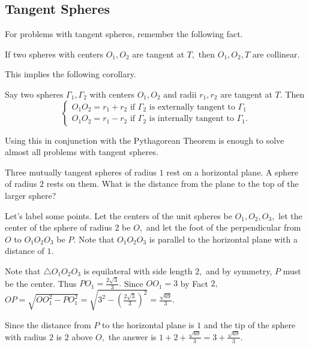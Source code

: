 \subsection{Tangent Spheres}
For problems with tangent spheres, remember the following fact.
\begin{fact}
If two spheres with centers $O_1,O_2$ are tangent at $T,$ then $O_1,O_2,T$ are collinear.
\end{fact}
This implies the following corollary.
\begin{fact}
Say two spheres $\Gamma_1,\Gamma_2$ with centers $O_1,O_2$ and radii $r_1,r_2$ are tangent at $T.$ Then
\[\begin{cases}
O_1O_2=r_1+r_2 \text{ if } \Gamma_2 \text{ is externally tangent to } \Gamma_1 \\
O_1O_2=r_1-r_2 \text{ if } \Gamma_2 \text{ is internally tangent to } \Gamma_1.
\end{cases}\]
\end{fact}
Using this in conjunction with the Pythagorean Theorem is enough to solve almost all problems with tangent spheres.
\begin{exam}[AMC 12A 2004/22]
Three mutually tangent spheres of radius $1$ rest on a horizontal plane. A sphere of radius $2$ rests on them. What is the distance from the plane to the top of the larger sphere?
\end{exam}
\begin{sol}
Let's label some points. Let the centers of the unit spheres be $O_1,O_2,O_3,$ let the center of the sphere of radius $2$ be $O,$ and let the foot of the perpendicular from $O$ to $O_1O_2O_3$ be $P.$ Note that $O_1O_2O_3$ is parallel to the horizontal plane with a distance of $1.$

Note that $\triangle O_1O_2O_3$ is equilateral with side length $2,$ and by symmetry, $P$ must be the center. Thus $PO_1=\frac{2\sqrt{3}}{3}.$ Since $OO_1=3$ by Fact $2,$ $OP=\sqrt{OO_1^2-PO_1^2}=\sqrt{3^2-(\frac{2\sqrt{3}}{3})^2}=\frac{\sqrt{69}}{3}.$

Since the distance from $P$ to the horizontal plane is $1$ and the tip of the sphere with radius $2$ is $2$ above $O,$ the answer is $1+2+\frac{\sqrt{69}}{3}=3+\frac{\sqrt{69}}{3}.$
\begin{center}
\end{center}
\end{sol}
